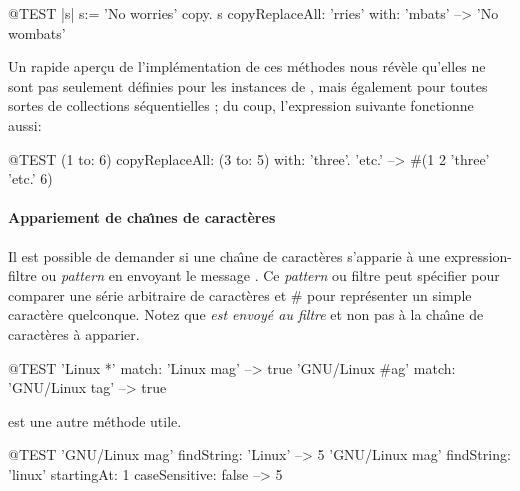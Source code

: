 \documentclass[a4paper,10pt,twoside]{book}
\begin{document}
\begin{code}{@TEST |s| s:= 'No worries' copy.}
s copyReplaceAll: 'rries' with: 'mbats' --> 'No wombats'
\end{code}

Un rapide aper\c{c}u de l'impl\'ementation de ces m\'ethodes nous r\'ev\`ele
qu'elles ne sont pas seulement d\'efinies pour les instances de
, mais également pour toutes sortes de collections 
s\'equentielles ; du coup, l'expression suivante
fonctionne aussi:

\begin{code}{@TEST}
(1 to: 6) copyReplaceAll: (3 to: 5) with: { 'three'. 'etc.' } --> #(1 2 'three' 'etc.' 6)
\end{code}

\paragraph{Appariement de cha\^{\i}nes de caractères}

Il est possible de demander si une cha\^{\i}ne de caract\`eres
s'apparie \`a  une expression-filtre ou \emph{pattern} en
envoyant le message .
Ce \emph{pattern} ou filtre peut sp\'ecifier \ct{*} pour
comparer une s\'erie arbitraire de caract\`eres et \# 
pour repr\'esenter un simple caract\`ere quelconque.
Notez que \emph{ est envoy\'e au filtre} et non pas \`a la cha\^{\i}ne
de caract\`eres \`a apparier.
\begin{code}{@TEST}
'Linux *' match: 'Linux mag'                      --> true
'GNU/Linux #ag' match: 'GNU/Linux tag' --> true
\end{code}

 est une autre m\'ethode utile.
\begin{code}{@TEST}
'GNU/Linux mag' findString: 'Linux'                                                      --> 5
'GNU/Linux mag' findString: 'linux' startingAt: 1 caseSensitive: false  --> 5
\end{code}

\end{document}
